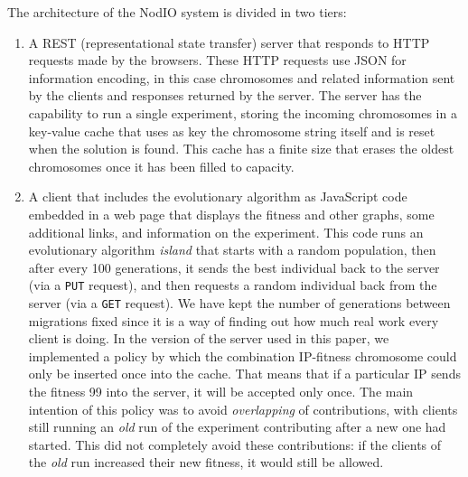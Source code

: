 \documentclass[runningheads,a4paper]{llncs}\usepackage[]{graphicx}\usepackage[]{color}
\begin{document}
The architecture of the {\sf NodIO} system is divided in two tiers:\begin{enumerate}
\item A REST (representational state transfer) server that responds to
  HTTP requests made by the browsers. These HTTP requests use JSON for information 
  encoding, in this case chromosomes and related
  information sent by the clients and responses returned by the
  server.  The server has the capability to
  run a single experiment, storing the incoming chromosomes in a
  key-value cache that uses as key the chromosome string itself and is
  reset when the solution is found. This cache has a finite 
  size that erases the oldest chromosomes once it has been filled to %
  capacity.  
\item A client that includes the evolutionary algorithm as
  JavaScript code embedded in a web page that displays the fitness and
  other graphs, some
  additional links, and information on the experiment. This code runs
  an evolutionary algorithm {\em island} that starts with a random
  population, then after every 100 generations, it sends the best individual
  back to the server (via a {\tt PUT} request), and then requests a random
  individual back from the server (via a {\tt GET} request). We have
  kept the number of generations between migrations fixed since it is
  a way of finding out how much real work every client is doing. In
  the version of the server used in this paper, we implemented a
  policy by which the combination IP-fitness chromosome could only be
  inserted once into the cache. That means that if a particular IP
  sends the fitness 99 into the server, it will be accepted only
  once. The main intention of this policy was to avoid {\em
    overlapping} of contributions, with clients still running an {\em
    old} run of the experiment contributing after a new one had
  started. This did not completely avoid these contributions: if the
  clients of the {\em old} run increased their new fitness, it would
  still be allowed. 
\end{enumerate}
\end{document}
